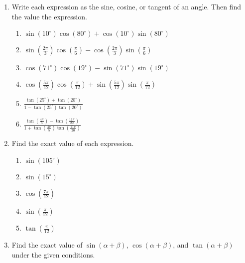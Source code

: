 \begin{enumerate}



\item Write each expression as the sine, cosine, or tangent of an angle.  Then find the value the expression.
\begin{enumerate}
\item $\sin(10^\circ)\cos(80^\circ)+\cos(10^\circ)\sin(80^\circ)$
\vfill
\item $\displaystyle\sin\left(\frac{2\pi}{3}\right)\cos\left(\frac{\pi}{6}\right)-\cos\left(\frac{2\pi}{3}\right)\sin\left(\frac{\pi}{6}\right)$
\vfill
\item $\cos(71^\circ)\cos(19^\circ)-\sin(71^\circ)\sin(19^\circ)$
\vfill
\item $\displaystyle\cos\left(\frac{5\pi}{12}\right)\cos\left(\frac{\pi}{12}\right)+\sin\left(\frac{5\pi}{12}\right)\sin\left(\frac{\pi}{12}\right)$
\vfill
\newpage
\item $\displaystyle \frac{\tan(25^\circ)+\tan(20^\circ)}{1-\tan(25^\circ)\tan(20^\circ)}$
\vfill
\item $\displaystyle \frac{\tan\left(\frac{4\pi}{5}\right)-\tan\left(\frac{11\pi}{20}\right)}{1+\tan\left(\frac{4\pi}{5}\right)\tan\left(\frac{11\pi}{20}\right)}$
\vfill
\end{enumerate}


\item Find the exact value of each expression.

\begin{enumerate}

\item $\sin(105^\circ)$
\vfill
\item $\sin(15^\circ)$
\vfill

\newpage

\item $\displaystyle\cos\left(\frac{7\pi}{12}\right)$

\vfill
\item $\displaystyle \sin\left(\frac{\pi}{12}\right)$

\vfill


\item $\displaystyle \tan\left(\frac{\pi}{12}\right)$
\vfill


\end{enumerate}

\newpage

\item Find the exact value of $\sin(\alpha+\beta)$, $\cos(\alpha+\beta)$, and $\tan(\alpha+\beta)$ under the given conditions.


\end{enumerate}

